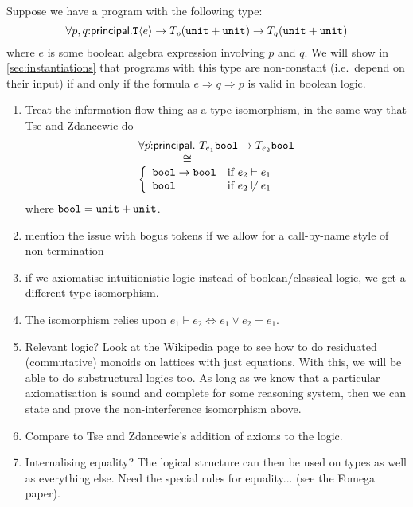 \begin{example}
  Suppose we have a program with the following type:
  \begin{displaymath}
    \forall p,q\mathord:\mathsf{principal}. \textup{\texttt{T}}\langle e \rangle \to T_p(\texttt{unit} + \texttt{unit}) \to T_q(\texttt{unit} + \texttt{unit})
  \end{displaymath}
  where $e$ is some boolean algebra expression involving $p$ and
  $q$. We will show in \autoref{sec:instantiations} that programs with
  this type are non-constant (i.e.~depend on their input) if and only
  if the formula $e \Rightarrow q \Rightarrow p$ is valid in boolean
  logic.
\end{example}

\begin{enumerate}
\item Treat the information flow thing as a type isomorphism, in the
  same way that Tse and Zdancewic do
  \begin{displaymath}
    \begin{array}{l}
    \forall \vec{p}\mathord:\mathsf{principal}.\ T_{e_1}\texttt{bool} \to T_{e_2}\texttt{bool}\\
    \hspace{4em}\cong \\
    \left\{
      \begin{array}{ll}
        \texttt{bool} \to \texttt{bool} & \textrm{if }e_2 \vdash e_1 \\
        \texttt{bool} & \textrm{if }e_2 \not\vdash e_1
      \end{array}
    \right.
  \end{array}
  \end{displaymath}
  where $\texttt{bool} = \texttt{unit} + \texttt{unit}$.
\item mention the issue with bogus tokens if we allow for a
  call-by-name style of non-termination
\item if we axiomatise intuitionistic logic instead of
  boolean/classical logic, we get a different type isomorphism.
\item The isomorphism relies upon $e_1 \vdash e_2 \Leftrightarrow e_1
  \lor e_2 = e_1$.
\item Relevant logic? Look at the Wikipedia page to see how to do
  residuated (commutative) monoids on lattices with just
  equations. With this, we will be able to do substructural logics
  too. As long as we know that a particular axiomatisation is sound
  and complete for some reasoning system, then we can state and prove
  the non-interference isomorphism above.
\item Compare to Tse and Zdancewic's addition of axioms to the logic.
\item Internalising equality? The logical structure can then be used
  on types as well as everything else. Need the special rules for
  equality... (see the Fomega paper).
\end{enumerate}


